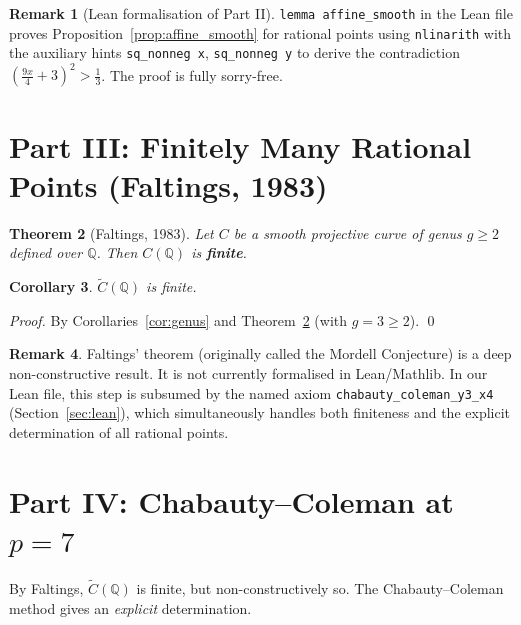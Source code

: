 \documentclass[12pt, a4paper]{article}
\newtheorem{theorem}{Theorem}[section]
\newtheorem{corollary}[theorem]{Corollary}
\theoremstyle{definition}
\newtheorem{remark}[theorem]{Remark}
\newcommand{\Q}{\mathbb{Q}}
\begin{document}
\begin{remark}[Lean formalisation of Part II]
  \texttt{lemma affine\_smooth} in the Lean file proves
  Proposition~\ref{prop:affine_smooth} for rational points using
  \texttt{nlinarith} with the auxiliary hints \texttt{sq\_nonneg~x},
  \texttt{sq\_nonneg~y} to derive the contradiction $(\tfrac{9x}{4}+3)^2 > \tfrac{1}{3}$.
  The proof is fully sorry-free.
\end{remark}

\section{Part III: Finitely Many Rational Points (Faltings, 1983)}\label{sec:faltings}

\begin{theorem}[Faltings, 1983]\label{thm:faltings}
  Let $C$ be a smooth projective curve of genus $g \geq 2$ defined over $\Q$.
  Then $C(\Q)$ is \textbf{finite}.
\end{theorem}

\begin{corollary}
  $\widetilde{C}(\Q)$ is finite.
\end{corollary}

\begin{proof}
  By Corollaries~\ref{cor:genus} and Theorem~\ref{thm:faltings} (with $g = 3 \geq 2$). \qed
\end{proof}

\begin{remark}
  Faltings' theorem (originally called the Mordell Conjecture) is a deep
  non-constructive result.  It is not currently formalised in Lean/Mathlib.
  In our Lean file, this step is subsumed by the named axiom
  \texttt{chabauty\_coleman\_y3\_x4} (Section~\ref{sec:lean}), which
  simultaneously handles both finiteness and the explicit determination
  of all rational points.
\end{remark}

\section{Part IV: Chabauty--Coleman at $p = 7$}\label{sec:chabauty}

By Faltings, $\widetilde{C}(\Q)$ is finite, but non-constructively so.
The Chabauty--Coleman method gives an \emph{explicit} determination.
\end{document}
